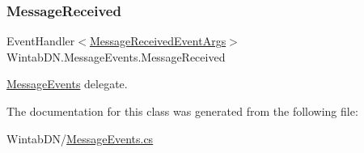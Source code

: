 \subsubsection{\texorpdfstring{Message\+Received}{MessageReceived}}
{\footnotesize\ttfamily Event\+Handler$<$\mbox{\hyperlink{class_wintab_d_n_1_1_message_received_event_args}{Message\+Received\+Event\+Args}}$>$ Wintab\+D\+N.\+Message\+Events.\+Message\+Received\hspace{0.3cm}{\ttfamily [static]}}



\mbox{\hyperlink{class_wintab_d_n_1_1_message_events}{Message\+Events}} delegate. 



The documentation for this class was generated from the following file\+:\begin{DoxyCompactItemize}
\item 
Wintab\+D\+N/\mbox{\hyperlink{_message_events_8cs}{Message\+Events.\+cs}}\end{DoxyCompactItemize}
